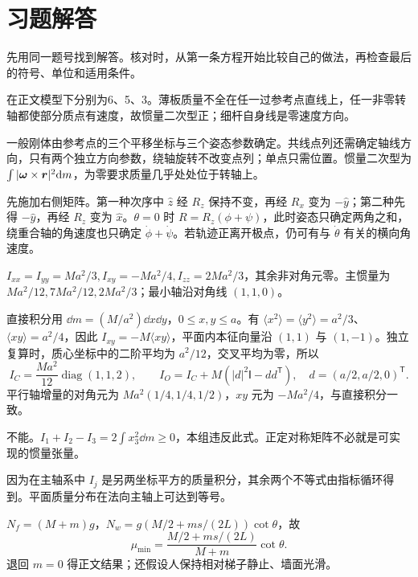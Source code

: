 \section*{习题解答}
先用同一题号找到解答。核对时，从第一条方程开始比较自己的做法，再检查最后的符号、单位和适用条件。
\begin{bookexercises}
\item 在正文模型下分别为6、5、3。薄板质量不全在任一过参考点直线上，任一非零转轴都使部分质点有速度，故惯量二次型正；细杆自身线是零速度方向。

一般刚体由参考点的三个平移坐标与三个姿态参数确定。共线点列还需确定轴线方向，只有两个独立方向参数，绕轴旋转不改变点列；单点只需位置。惯量二次型为 $\int|\boldsymbol\omega\times\boldsymbol{r}|^2\mathrm{d} m$，为零要求质量几乎处处位于转轴上。
\item 先施加右侧矩阵。第一种次序中 $\hat z$ 经 $R_z$ 保持不变，再经 $R_x$ 变为 $-\hat y$；第二种先得 $-\hat y$，再经 $R_z$ 变为 $\hat x$。$\theta=0$ 时 $R=R_z(\phi+\psi)$，此时姿态只确定两角之和，绕重合轴的角速度也只确定 $\dot\phi+\dot\psi$。若轨迹正离开极点，仍可有与 $\dot\theta$ 有关的横向角速度。
\item $I_{xx}=I_{yy}=Ma^2/3,I_{xy}=-Ma^2/4,I_{zz}=2Ma^2/3$，其余非对角元零。主惯量为 $Ma^2/12,7Ma^2/12,2Ma^2/3$；最小轴沿对角线 $(1,1,0)$。

直接积分用 $\dd m=(M/a^2)\dd x\dd y$，$0\le x,y\le a$。有 $\langle x^2\rangle=\langle y^2\rangle=a^2/3$、$\langle xy\rangle=a^2/4$，因此 $I_{xy}=-M\langle xy\rangle$，平面内本征向量沿 $(1,1)$ 与 $(1,-1)$。独立复算时，质心坐标中的二阶平均为 $a^2/12$，交叉平均为零，所以
\[
I_C=\frac{Ma^2}{12}\operatorname{diag}(1,1,2),\qquad
I_O=I_C+M(|d|^2\mathsf I-dd^{\mathsf T}),\quad
d=(a/2,a/2,0)^{\mathsf T}.
\]
平行轴增量的对角元为 $Ma^2(1/4,1/4,1/2)$，$xy$ 元为 $-Ma^2/4$，与直接积分一致。
\item 不能。$I_1+I_2-I_3=2\int x_3^2\dd m\ge0$，本组违反此式。正定对称矩阵不必就是可实现的惯量张量。

因为在主轴系中 $I_j$ 是另两坐标平方的质量积分，其余两个不等式由指标循环得到。平面质量分布在法向主轴上可达到等号。
\item $N_f=(M+m)g$，$N_w=g(M/2+ms/(2L))\cot\theta$，故
\[\mu_{\min}=\frac{M/2+ms/(2L)}{M+m}\cot\theta.\]
退回 $m=0$ 得正文结果；还假设人保持相对梯子静止、墙面光滑。


\end{bookexercises}
